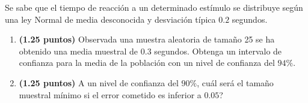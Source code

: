 
Se sabe que el tiempo de reacción a un determinado estímulo se distribuye según una ley Normal de media desconocida y desviación típica $0.2$ segundos.
\begin{enumerate}[label=\alph*)]
\item \textbf{(1.25 puntos)} Observada una muestra aleatoria de tamaño 25 se ha obtenido una media muestral de $0.3$ segundos. Obtenga un intervalo de confianza para la media de la población con un nivel de confianza del $94\%$.
\item \textbf{(1.25 puntos)} A un nivel de confianza del $90\%$, \textquestiondown{}cuál será el tamaño muestral mínimo si el error cometido es inferior a $0.05$?
\end{enumerate}
